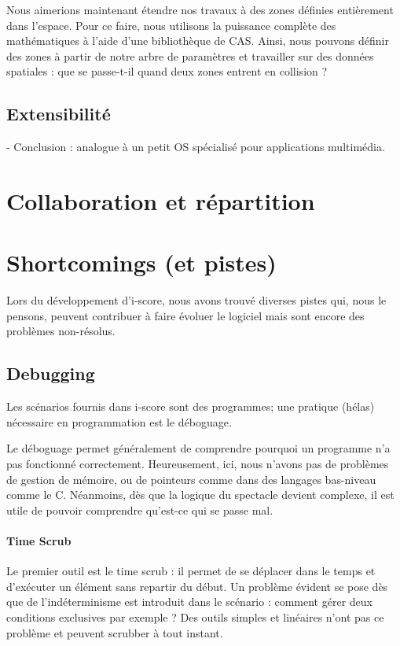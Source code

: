 \documentclass{sigchi}
\begin{document}
Nous aimerions maintenant étendre nos travaux à des zones définies entièrement dans l'espace. Pour ce faire, nous utilisons la puissance complète des mathématiques à l'aide d'une bibliothèque de CAS. Ainsi, nous pouvons définir des zones à partir de notre arbre de paramètres et travailler sur des données spatiales : que se passe-t-il quand deux zones entrent en collision ?
    
\subsection{Extensibilité}

- Conclusion : analogue à un petit OS spécialisé pour applications multimédia.

\section{Collaboration et répartition}

\section{Shortcomings (et pistes)}
Lors du développement d'i-score, nous avons trouvé diverses pistes qui, nous le pensons, peuvent contribuer à 
faire évoluer le logiciel mais sont encore des problèmes non-résolus.

\subsection{Debugging}
Les scénarios fournis dans i-score sont des programmes; une pratique (hélas) nécessaire en programmation est le déboguage. 

Le déboguage permet généralement de comprendre pourquoi un programme n'a pas fonctionné correctement. Heureusement, ici, nous n'avons pas de problèmes de gestion de mémoire, ou de pointeurs comme dans des langages  bas-niveau comme le C. Néanmoins, dès que la logique du spectacle devient complexe, il est utile de pouvoir comprendre qu'est-ce qui se passe mal.

\paragraph{Time Scrub}
Le premier outil est le time scrub : il permet de se déplacer dans le temps et d'exécuter un élément sans repartir du début. Un problème évident se pose dès que de l'indéterminisme est introduit dans le scénario : comment gérer deux conditions exclusives par exemple ? Des outils simples et linéaires n'ont pas ce problème et peuvent scrubber à tout instant.
\end{document}
